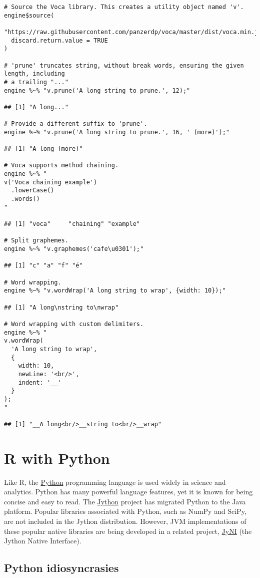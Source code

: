 \begin{verbatim}
# Source the Voca library. This creates a utility object named 'v'.
engine$source(
  "https://raw.githubusercontent.com/panzerdp/voca/master/dist/voca.min.js",
  discard.return.value = TRUE
)

# 'prune' truncates string, without break words, ensuring the given length, including
# a trailing "..."
engine %~% "v.prune('A long string to prune.', 12);"

## [1] "A long..."

# Provide a different suffix to 'prune'.
engine %~% "v.prune('A long string to prune.', 16, ' (more)');"

## [1] "A long (more)"

# Voca supports method chaining.
engine %~% "
v('Voca chaining example')
  .lowerCase()
  .words()
"

## [1] "voca"     "chaining" "example"

# Split graphemes.
engine %~% "v.graphemes('cafe\u0301');"

## [1] "c" "a" "f" "é"

# Word wrapping.
engine %~% "v.wordWrap('A long string to wrap', {width: 10});"

## [1] "A long\nstring to\nwrap"

# Word wrapping with custom delimiters.
engine %~% "
v.wordWrap(
  'A long string to wrap',
  {
    width: 10,
    newLine: '<br/>',
    indent: '__'
  }
);
"

## [1] "__A long<br/>__string to<br/>__wrap"
\end{verbatim}

\section{R with Python}

Like R, the \href{https://www.python.org/}{Python} programming language is used widely in science and analytics. Python has many powerful language features, yet it is known for being concise and easy to read. The \href{http://www.jython.org/}{Jython} project has migrated Python to the Java platform. Popular libraries associated with Python, such as NumPy and SciPy, are not included in the Jython distribution. However, JVM implementations of these popular native libraries are being developed in a related project, \href{http://www.jyni.org/}{JyNI} (the Jython Native Interface).

\subsection{Python idiosyncrasies}

